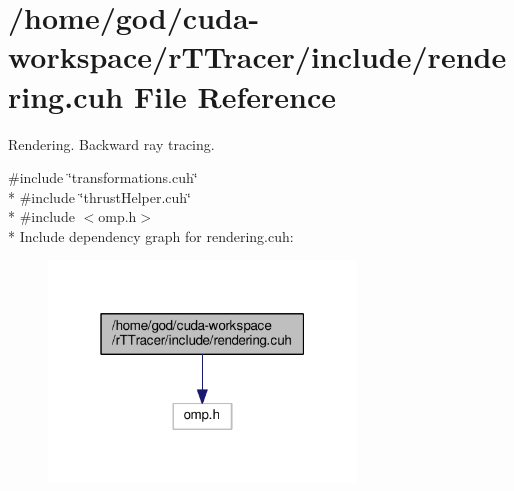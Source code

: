 \hypertarget{r_t_tracer_2include_2rendering_8cuh}{}\section{/home/god/cuda-\/workspace/r\+T\+Tracer/include/rendering.cuh File Reference}
\label{r_t_tracer_2include_2rendering_8cuh}


Rendering. Backward ray tracing.  


{\ttfamily \#include \char`\"{}transformations.\+cuh\char`\"{}}\\*
{\ttfamily \#include \char`\"{}thrust\+Helper.\+cuh\char`\"{}}\\*
{\ttfamily \#include $<$omp.\+h$>$}\\*
Include dependency graph for rendering.\+cuh\+:
\nopagebreak
\begin{figure}[H]
\begin{center}
\leavevmode
\includegraphics[width=232pt]{r_t_tracer_2include_2rendering_8cuh__incl}
\end{center}
\end{figure}
